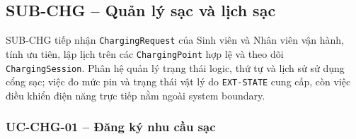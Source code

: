 \subsection{SUB-CHG -- Quản lý sạc và lịch sạc}

SUB-CHG tiếp nhận \texttt{ChargingRequest} của Sinh viên và Nhân viên vận hành, tính ưu tiên, lập lịch trên các \texttt{ChargingPoint} hợp lệ và theo dõi \texttt{ChargingSession}. Phân hệ quản lý trạng thái logic, thứ tự và lịch sử sử dụng cổng sạc; việc đo mức pin và trạng thái vật lý do \texttt{EXT-STATE} cung cấp, còn việc điều khiển điện năng trực tiếp nằm ngoài system boundary.

\subsubsection{UC-CHG-01 -- Đăng ký nhu cầu sạc}


